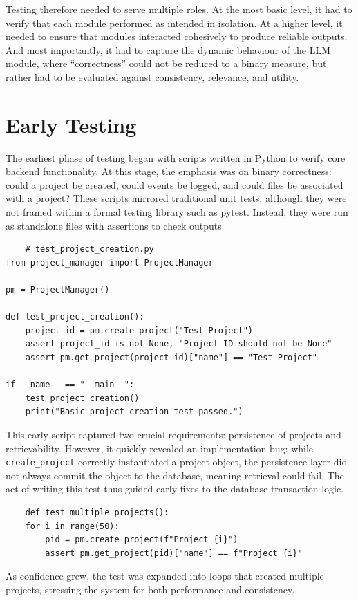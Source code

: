 \documentclass{report}
\begin{document}
Testing therefore needed to serve multiple roles. At the most basic level, it had to verify that each module performed as intended in isolation. At a higher level, it needed to ensure that modules interacted cohesively to produce reliable outputs. And most importantly, it had to capture the dynamic behaviour of the LLM module, where “correctness” could not be reduced to a binary measure, but rather had to be evaluated against consistency, relevance, and utility.
\section{Early Testing}

The earliest phase of testing began with scripts written in Python to verify core backend functionality. 
At this stage, the emphasis was on binary correctness: could a project be created, could events be logged, and could files be associated with a project? 
These scripts mirrored traditional unit tests, although they were not framed within a formal testing library such as pytest. 
Instead, they were run as standalone files with assertions to check outputs
\begin{lstlisting}
    # test_project_creation.py
from project_manager import ProjectManager

pm = ProjectManager()

def test_project_creation():
    project_id = pm.create_project("Test Project")
    assert project_id is not None, "Project ID should not be None"
    assert pm.get_project(project_id)["name"] == "Test Project"

if __name__ == "__main__":
    test_project_creation()
    print("Basic project creation test passed.")
\end{lstlisting}

This early script captured two crucial requirements: persistence of projects and retrievability. 
However, it quickly revealed an implementation bug: while \texttt{create\_project} correctly instantiated a project object, the persistence layer did not always commit the object to the database, meaning retrieval could fail. 
The act of writing this test thus guided early fixes to the database transaction logic.

\begin{lstlisting}
    def test_multiple_projects():
    for i in range(50):
        pid = pm.create_project(f"Project {i}")
        assert pm.get_project(pid)["name"] == f"Project {i}"

\end{lstlisting}    
As confidence grew, the test was expanded into loops that created multiple projects, stressing the system for both performance and consistency.
\end{document}
